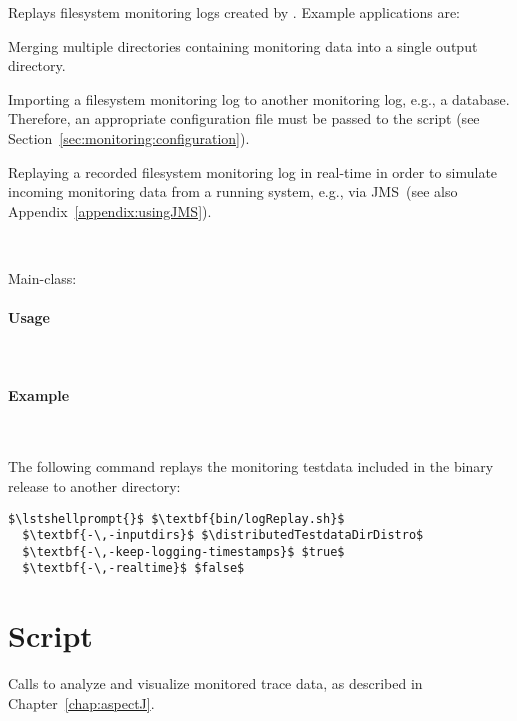 Replays filesystem monitoring logs created by \KiekerMonitoringPart{}. %
Example applications are:
\begin{compactitem}
\item Merging multiple directories containing monitoring data into a single %
output directory. 
\item Importing a filesystem monitoring log to another monitoring log, e.g., %
a database. Therefore, an appropriate \KiekerMonitoringPart{} configuration %
file must be passed to the script (see Section~\ref{sec:monitoring:configuration}).
\item Replaying a recorded filesystem monitoring log in real-time in order to simulate %
incoming monitoring data from a running system, e.g., via JMS~(see also Appendix~\ref{appendix:usingJMS}). 
\end{compactitem}

\

\noindent Main-class: {\small {}}

\paragraph*{Usage}\

\setTextListing


\paragraph*{Example}\

\noindent The following command replays the monitoring testdata included in %
the binary release to another directory:

\setTextListing
\begin{lstlisting}
$\lstshellprompt{}$ $\textbf{bin/logReplay.sh}$
  $\textbf{-\,-inputdirs}$ $\distributedTestdataDirDistro$ 
  $\textbf{-\,-keep-logging-timestamps}$ $true$ 
  $\textbf{-\,-realtime}$ $false$
\end{lstlisting}

\section{Script }

Calls \KiekerTraceAnalysis{} to analyze and visualize monitored trace data, %
as described in Chapter~\ref{chap:aspectJ}.

\


